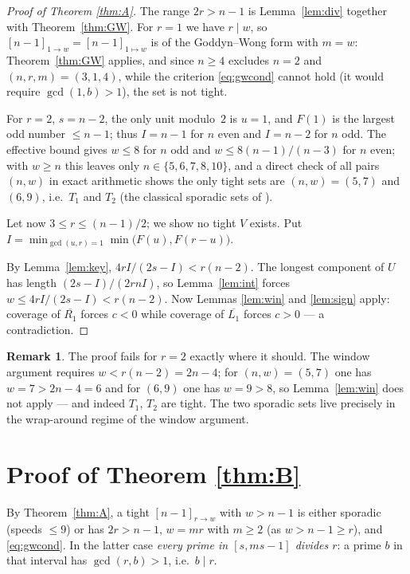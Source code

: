 \documentclass[11pt]{article}
\theoremstyle{definition}
\newtheorem{remark}[theorem]{Remark}
\begin{document}
\begin{proof}[Proof of Theorem \ref{thm:A}]
The range $2r>n-1$ is Lemma~\ref{lem:div} together with
Theorem~\ref{thm:GW}.  For $r=1$ we have $r\mid w$, so
$[n-1]_{1\to w}=[n-1]_{1\mapsto w}$ is of the Goddyn--Wong form with
$m=w$: Theorem~\ref{thm:GW} applies, and since $n\ge4$ excludes $n=2$
and $(n,r,m)=(3,1,4)$, while the criterion \eqref{eq:gwcond} cannot
hold (it would require $\gcd(1,b)>1$), the set is not tight.

For $r=2$, $s=n-2$, the only unit modulo~$2$ is
$u=1$, and $F(1)$ is the largest odd number $\le n-1$; thus $I=n-1$ for $n$
even and $I=n-2$ for $n$ odd.  The effective bound gives
$w\le 8$ for $n$ odd and $w\le 8(n-1)/(n-3)$ for $n$ even; with $w\ge n$
this leaves only $n\in\{5,6,7,8,10\}$, and a direct check of all pairs
$(n,w)$ in exact arithmetic shows the only tight sets are $(n,w)=(5,7)$ and
$(6,9)$, i.e.\ $T_1$ and $T_2$ (the classical sporadic sets of
\cite{Wills1968}).

Let now $3\le r\le(n-1)/2$; we show no tight
$V$ exists. Put $I=\min_{\gcd(u,r)=1}\min\bigl(F(u),F(r-u)\bigr)$.

By Lemma~\ref{lem:key}, $4rI/(2s-I)<r(n-2)$. The longest component
of $U$ has length $(2s-I)/(2rnI)$, so Lemma~\ref{lem:int} forces
$w\le4rI/(2s-I)<r(n-2)$. Now Lemmas \ref{lem:win} and \ref{lem:sign}
apply: coverage of $\overline{R_1}$ forces $c<0$ while coverage of
$\overline{L_1}$ forces $c>0$ --- a contradiction.
\end{proof}

\begin{remark}
The proof fails for $r=2$ exactly where it should. The window argument
requires $w<r(n-2)=2n-4$; for $(n,w)=(5,7)$ one has $w=7>2n-4=6$ and for
$(6,9)$ one has $w=9>8$, so Lemma~\ref{lem:win} does not apply --- and indeed
$T_1$, $T_2$ are tight. The two sporadic sets live precisely in the
wrap-around regime of the window argument.
\end{remark}

\section{Proof of Theorem \ref{thm:B}}\label{sec:thmB}

By Theorem~\ref{thm:A}, a tight $[n-1]_{r\to w}$ with $w>n-1$ is either
sporadic (speeds $\le9$) or has $2r>n-1$, $w=mr$ with $m\ge2$ (as
$w>n-1\ge r$), and \eqref{eq:gwcond}. In the latter case \emph{every prime
in $[s,ms-1]$ divides $r$}: a prime $b$ in that interval has
$\gcd(r,b)>1$, i.e.\ $b\mid r$.
\end{document}
